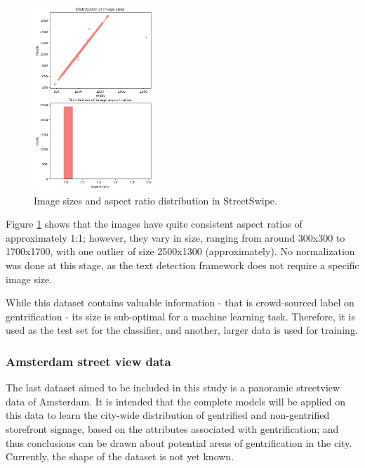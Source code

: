 \begin{figure}[H]
    \centering
    \includegraphics[width=0.4\textwidth]{media/methodology/SS_size_ar.png}
    \caption{Image sizes and aspect ratio distribution in StreetSwipe.}
    \label{fig:SS_size_ar}
\end{figure}

Figure \ref{fig:SS_size_ar} shows that the images have quite consistent aspect ratios of approximately 1:1; however, they vary in size, ranging from around 300x300 to 1700x1700, with one outlier of size 2500x1300 (approximately). No normalization was done at this stage, as the text detection framework does not require a specific image size.

While this dataset contains valuable information - that is crowd-sourced label on gentrification - its size is sub-optimal for a machine learning task. Therefore, it is used as the test set for the classifier, and another, larger data is used for training.

\subsubsection{Amsterdam street view data}
The last dataset aimed to be included in this study is a panoramic streetview data of Amsterdam. It is intended that the complete models will be applied on this data to learn the city-wide distribution of gentrified and non-gentrified storefront signage, based on the attributes associated with gentrification; and thus conclusions can be drawn about potential areas of gentrification in the city. Currently, the shape of the dataset is not yet known.

